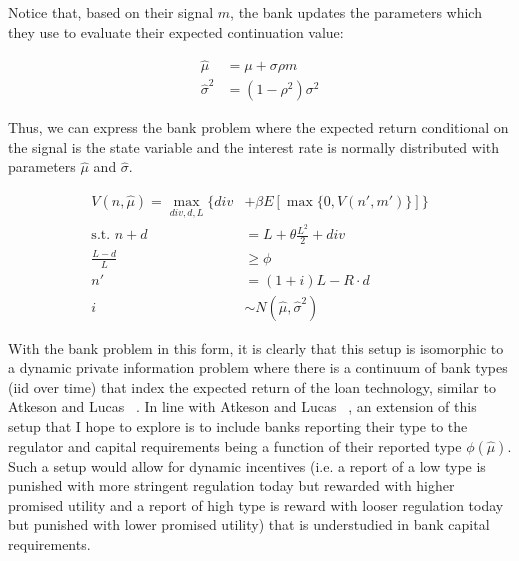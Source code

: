 \documentclass[12pt]{article}
\begin{document}
Notice that, based on their signal $m$, the bank updates the parameters which they use to evaluate their expected continuation value:

\begin{align*}
\hat\mu &=  \mu + \sigma \rho m\\
\hat\sigma^2 &=  (1 - \rho^2)\sigma^2
\end{align*}

Thus, we can express the bank problem where the expected return conditional on the signal is the state variable and the interest rate is normally distributed with parameters $\hat\mu$ and $\hat\sigma$.

\begin{align*}
V(n, \hat\mu) = \max_{div, d, L} \Big\{ div &+ \beta E [\max\{0, V(n', m')\}]\Big\} \\
\text{s.t. } 
n + d &= L + \theta \frac{L^2}{2} + div\\
\frac{L - d}{L} & \ge \phi\\
n' &= (1 + i)L - R \cdot d \\
i &\sim N(\hat\mu, \hat\sigma^2)
\end{align*}

With the bank problem in this form, it is clearly that this setup is isomorphic to a dynamic private information problem where there is a continuum of bank types (iid over time) that index the expected return of the loan technology, similar to Atkeson and Lucas ~\cite{atkeson_lucas_1992}.  In line with Atkeson and Lucas ~\cite{atkeson_lucas_1992}, an extension of this setup that I hope to explore is to include banks reporting their type to the regulator and capital requirements being a function of their reported type $\phi(\hat\mu)$.  Such a setup would allow for dynamic incentives (i.e. a report of a low type is punished with more stringent regulation today but rewarded with higher promised utility and a report of high type is reward with looser regulation today but punished with lower promised utility) that is understudied in bank capital requirements.

\bigskip
\end{document}
